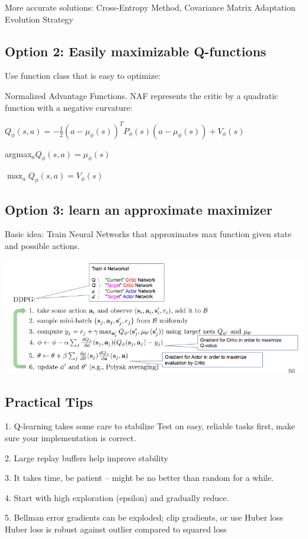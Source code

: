 \documentclass{article}
\begin{document}
More accurate solutions: Cross-Entropy Method, Covariance Matrix Adaptation Evolution Strategy

\subsection{Option 2: Easily maximizable Q-functions}
Use function class that is easy to optimize:

Normalized Advantage Functions. NAF represents the critic by a quadratic function with a negative curvature:

$Q_{\phi}(s, a) = -\frac{1}{2} (a- \mu_{\phi}(s))^T P_{\phi}(s)(a- \mu_{\phi}(s)) + V_{\phi}(s)$

argmax$_a Q_{\phi} (s, a) = \mu_{\phi}(s)$

$\max_a Q_{\phi} (s, a) = V_{\phi} (s)$

\subsection{Option 3: learn an approximate maximizer}
Basic idea: Train Neural Networks that approximates max function given state and possible actions.

\includegraphics[scale=0.5]{DDPG.png}

\subsection{Practical Tips}
1. Q-learning takes some care to stabilize
Test on easy, reliable tasks first, make sure your implementation is correct.

2. Large replay buffers help improve stability

3. It takes time, be patient – might be no better than random for a while.

4. Start with high exploration (epsilon) and gradually reduce.

5. Bellman error gradients can be exploded; clip gradients, or use Huber loss
Huber loss is robust against outlier compared to squared loss
\end{document}
